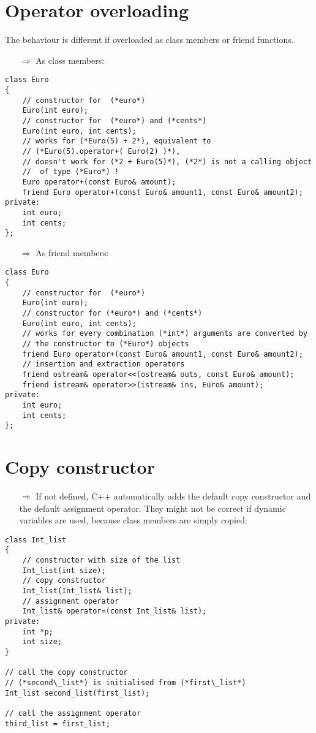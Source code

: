 \documentclass[10pt]{article}
\begin{document}
\section{Operator overloading}
\small
The behaviour is different if overloaded as class members or 
friend functions.
\begin{enumerate}
\item[$\Rightarrow$] As class members:
\end{enumerate}
\begin{lstlisting}
class Euro
{
    // constructor for  (*euro*)
    Euro(int euro);
    // constructor for  (*euro*) and (*cents*)
    Euro(int euro, int cents);
    // works for (*Euro(5) + 2*), equivalent to 
    // (*Euro(5).operator+( Euro(2) )*),
    // doesn't work for (*2 + Euro(5)*), (*2*) is not a calling object
    //  of type (*Euro*) !
    Euro operator+(const Euro& amount); 
    friend Euro operator+(const Euro& amount1, const Euro& amount2);
private:
    int euro;
    int cents;
};
\end{lstlisting}
\begin{enumerate}
\item[$\Rightarrow$] As friend members:
\end{enumerate}
\begin{lstlisting}
class Euro
{
    // constructor for  (*euro*)
    Euro(int euro);
    // constructor for (*euro*) and (*cents*)
    Euro(int euro, int cents);
    // works for every combination (*int*) arguments are converted by 
    // the constructor to (*Euro*) objects
    friend Euro operator+(const Euro& amount1, const Euro& amount2);
    // insertion and extraction operators
    friend ostream& operator<<(ostream& outs, const Euro& amount);
    friend istream& operator>>(istream& ins, Euro& amount);
private:
    int euro;
    int cents;
};
\end{lstlisting}
%
%
\section{Copy constructor}
\small
\begin{enumerate}
\item[$\Rightarrow$] If not defined, C++ automatically adds the default copy
constructor and the default assignment operator.
They might not be correct if dynamic variables are used,
because class members are simply copied:
\end{enumerate}
\begin{lstlisting}
class Int_list
{
    // constructor with size of the list
    Int_list(int size);
    // copy constructor
    Int_list(Int_list& list);
    // assignment operator
    Int_list& operator=(const Int_list& list);
private:
    int *p;
    int size;
}

// call the copy constructor
// (*second\_list*) is initialised from (*first\_list*)
Int_list second_list(first_list); 

// call the assignment operator
third_list = first_list;
\end{lstlisting}
%
%
\end{document}
